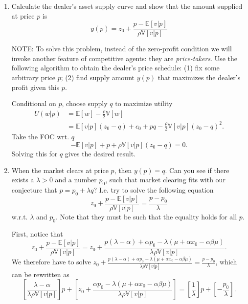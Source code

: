 \documentclass[11pt
]{exam}
\begin{document}
\begin{enumerate}[label=(\alph*). ]
\item Calculate the dealer's asset supply curve and show that the amount supplied at price $p$ is
\[
y(p) =z_{0} +  \frac{p - \mathbb{E}[v|p]}{\rho \mathbb{V}[v|p]} 
\]

NOTE: To solve this problem, instead of the zero-profit condition we will invoke another feature of competitive agents: they are \emph{price-takers}. Use the following algorithm to obtain the dealer's price schedule: (1) fix some arbitrary price $p$; (2) find supply amount $y(p)$ that maximizes the dealer's profit given this $p$. 

\begin{solution}
Conditional on $p$, choose supply $q$ to maximize utility
\begin{align*}
U(w|p) 
& = \mathbb{E}[w] - \frac{\rho}{2} \mathbb{V}[w] \\
& = \mathbb{E}[v|p](z_{0}-q) + c_{0}+pq - \frac{\rho}{2} \mathbb{V}[v|p](z_{0}-q)^{2}.
\end{align*}
Take the FOC wrt. $q$
\[
-\mathbb{E}[v|p] + p +\rho\mathbb{V}[v|p](z_{0}-q) = 0.
\]
Solving this for $q$ gives the desired result.
\end{solution}


\item When the market clears at price $p$, then $y(p)=q$. Can you see if there exists a $\lambda>0$ and a number $p_{0}$, such that market clearing fits with our conjecture that $p=p_{0}+\lambda q$? I.e. try to solve the following equation
\[
z_{0} +  \frac{p - \mathbb{E}[v|p]}{\rho \mathbb{V}[v|p]} = \frac{p-p_{0}}{\lambda}
\]
w.r.t. $\lambda$ and $p_0$. Note that they must be such that the equality holds for all $p$.

\begin{solution}
First, notice that
\[
z_{0}+ \frac{p-\mathbb{E}[v|p]}{\rho \mathbb{V}[v|p]}=z_{0}+\frac{p(\lambda-\alpha) +\alpha p_{0}-\lambda (\mu + \alpha x_{0} - \alpha \beta \mu) }{\lambda \rho \mathbb{V}[v|p]}.
\]
We therefore have to solve $z_{0}+\frac{p(\lambda-\alpha) +\alpha p_{0}-\lambda (\mu + \alpha x_{0} - \alpha \beta \mu) }{\lambda \rho \mathbb{V}[v|p]}= \frac{p-p_{0}}{\lambda}$, which can be rewritten as
\[
\left[ \frac{\lambda-\alpha }{\lambda \rho \mathbb{V}[v|p]}  \right]p + \left[ z_{0} +\frac{\alpha p_{0}-\lambda (\mu + \alpha x_{0} - \alpha \beta \mu) }{\lambda \rho \mathbb{V}[v|p]} \right] = \left[\frac{1}{\lambda}\right]p + \left[-\frac{p_{0}}{\lambda}\right].
\]


\end{solution}
\end{enumerate}
\end{document}
